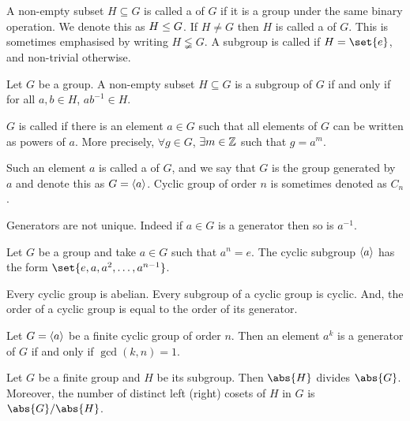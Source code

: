 \documentclass[11pt]{penrose}
\begin{document}
\begin{ndfn}[Subgroup]
    A non-empty subset $H \subseteq G$ is called a  of $G$ if it is a group under the same binary operation. We denote this as $H \mathrel{\leq} G$. If $H \neq G$ then $H$ is called a  of $G$. This is sometimes emphasised by writing $H \lneqq G$. A subgroup is called  if $H = \set{e}$, and non-trivial otherwise.
\end{ndfn}

\begin{nthm}
    Let $G$ be a group. A non-empty subset $H \subseteq G$ is a subgroup of $G$ if and only if for all $a, b \in H$, $ab^{-1} \in H$.
\end{nthm}

\begin{ndfn}
    $G$ is called  if there is an element $a \in G$ such that all elements of $G$ can be written as powers of $a$. More precisely, $\forall g \in G$, $\exists m \in \mathbb{Z}$ such that $g = a^m$.

    Such an element $a$ is called a  of $G$, and we say that $G$ is the group generated by $a$ and denote this as $G = \langle a\rangle$. Cyclic group of order $n$ is sometimes denoted as $C_n$.
\end{ndfn}

Generators are not unique. Indeed if $a \in G$ is a generator then so is $a^{-1}$.

\begin{nthm}
    Let $G$ be a group and take $a \in G$ such that $a^n = e$. The cyclic subgroup $\langle a\rangle$ has the form $\set{e, a, a^2, \dots, a^{n-1}}$.
\end{nthm}

\begin{nthm}
    Every cyclic group is abelian. Every subgroup of a cyclic group is cyclic. And, the order of a cyclic group is equal to the order of its generator.
\end{nthm}

\begin{nthm}
    Let $G = \langle a\rangle$ be a finite cyclic group of order $n$. Then an element $a^k$ is a generator of $G$ if and only if $\gcd(k,n) = 1$.
\end{nthm}

\begin{nthm}[Lagrange]
    Let $G$ be a finite group and $H$ be its subgroup. Then $\abs{H}$ divides $\abs{G}$. Moreover, the number of distinct left (right) cosets of $H$ in $G$ is $\abs{G}/\abs{H}$.
\end{nthm}
\end{document}
